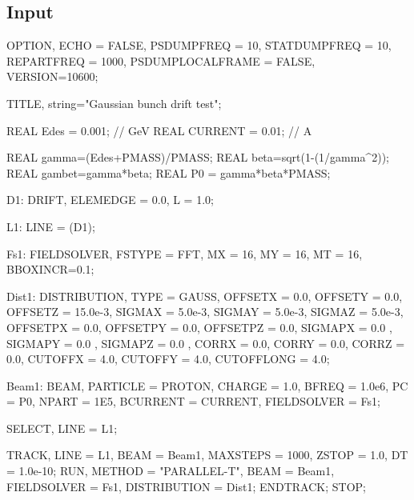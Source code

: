 \subsection{\opal Input}
\begin{longexample}
OPTION, ECHO = FALSE, PSDUMPFREQ = 10,
STATDUMPFREQ = 10, REPARTFREQ = 1000,
PSDUMPLOCALFRAME = FALSE, VERSION=10600;

TITLE, string="Gaussian bunch drift test";

REAL Edes    = 0.001;        // GeV
REAL CURRENT = 0.01;  // A

REAL gamma=(Edes+PMASS)/PMASS;
REAL beta=sqrt(1-(1/gamma^2));
REAL gambet=gamma*beta;
REAL P0 = gamma*beta*PMASS;

D1: DRIFT, ELEMEDGE = 0.0, L = 1.0;

L1: LINE = (D1);

Fs1: FIELDSOLVER, FSTYPE = FFT, MX = 16, MY = 16, MT = 16, BBOXINCR=0.1;

Dist1: DISTRIBUTION, TYPE = GAUSS,
       OFFSETX = 0.0, OFFSETY = 0.0, OFFSETZ = 15.0e-3,
       SIGMAX = 5.0e-3, SIGMAY = 5.0e-3, SIGMAZ = 5.0e-3,
       OFFSETPX = 0.0, OFFSETPY = 0.0, OFFSETPZ = 0.0,
       SIGMAPX = 0.0 , SIGMAPY = 0.0 , SIGMAPZ = 0.0 ,
       CORRX = 0.0, CORRY = 0.0, CORRZ = 0.0,
       CUTOFFX = 4.0, CUTOFFY = 4.0, CUTOFFLONG = 4.0;

Beam1: BEAM, PARTICLE = PROTON, CHARGE = 1.0, BFREQ = 1.0e6, PC = P0,
               NPART = 1E5, BCURRENT = CURRENT, FIELDSOLVER = Fs1;

SELECT, LINE = L1;

TRACK, LINE = L1, BEAM = Beam1, MAXSTEPS = 1000, ZSTOP = 1.0, DT = 1.0e-10;
 RUN, METHOD = "PARALLEL-T", BEAM = Beam1, FIELDSOLVER = Fs1, DISTRIBUTION = Dist1;
ENDTRACK;
STOP;
\end{longexample}

